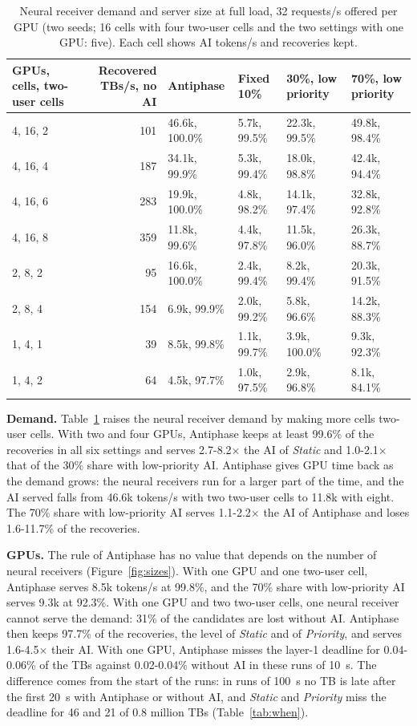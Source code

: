 \documentclass[acmsmall,screen,review,anonymous]{acmart}
\newcommand{\sys}{Antiphase\xspace}
\begin{document}
\begin{table}[t]
\caption{Neural receiver demand and server size at full load, 32 requests/s offered per GPU (two seeds;
16 cells with four two-user cells and the two settings with one GPU: five). Each cell shows AI tokens/s and
recoveries kept.}
\label{tab:scale}
\footnotesize
\setlength{\tabcolsep}{4.5pt}
\begin{tabular}{@{}lrllll@{}}
\toprule
GPUs, cells, two-user cells & Recovered TBs/s, no AI & \sys & Fixed 10\% & 30\%, low priority & 70\%, low priority \\
\midrule
4, 16, 2 & 101 & 46.6k, 100.0\% & 5.7k, 99.5\% & 22.3k, 99.5\% & 49.8k, 98.4\% \\
4, 16, 4 & 187 & 34.1k, 99.9\% & 5.3k, 99.4\% & 18.0k, 98.8\% & 42.4k, 94.4\% \\
4, 16, 6 & 283 & 19.9k, 100.0\% & 4.8k, 98.2\% & 14.1k, 97.4\% & 32.8k, 92.8\% \\
4, 16, 8 & 359 & 11.8k, 99.6\% & 4.4k, 97.8\% & 11.5k, 96.0\% & 26.3k, 88.7\% \\
2, 8, 2 & 95 & 16.6k, 100.0\% & 2.4k, 99.4\% & 8.2k, 99.4\% & 20.3k, 91.5\% \\
2, 8, 4 & 154 & 6.9k, 99.9\% & 2.0k, 99.2\% & 5.8k, 96.6\% & 14.2k, 88.3\% \\
1, 4, 1 & 39 & 8.5k, 99.8\% & 1.1k, 99.7\% & 3.9k, 100.0\% & 9.3k, 92.3\% \\
1, 4, 2 & 64 & 4.5k, 97.7\% & 1.0k, 97.5\% & 2.9k, 96.8\% & 8.1k, 84.1\% \\
\bottomrule
\end{tabular}
\end{table}

\noindent\textbf{Demand.} Table~\ref{tab:scale} raises the neural receiver demand by making more cells
two-user cells. With two and four GPUs, \sys keeps at least 99.6\% of the recoveries in all six settings
and serves 2.7-8.2$\times$ the AI of \textit{Static} and 1.0-2.1$\times$ that of the 30\% share with
low-priority AI. \sys gives GPU time back as the demand grows: the neural receivers run for a larger part
of the time, and the AI served falls from 46.6k tokens/s with two two-user cells to 11.8k with eight. The
70\% share with low-priority AI serves 1.1-2.2$\times$ the AI of \sys and loses 1.6-11.7\% of the recoveries.

\noindent\textbf{GPUs.} The rule of \sys has no value that depends on the number of neural receivers
(Figure~\ref{fig:sizes}). With one GPU and one two-user cell, \sys serves 8.5k tokens/s at 99.8\%, and the
70\% share with low-priority AI serves 9.3k at 92.3\%. With one GPU and two two-user cells, one neural
receiver cannot serve the demand: 31\% of the candidates are lost without AI. \sys then keeps 97.7\% of the
recoveries, the level of \textit{Static} and of \textit{Priority}, and serves
1.6-4.5$\times$ their AI. With one GPU, \sys misses the layer-1 deadline for 0.04-0.06\% of the TBs against
0.02-0.04\% without AI in these runs of 10~s. The difference comes from the start of the runs: in runs of
100~s no TB is late after the first 20~s with \sys or without AI, and \textit{Static} and \textit{Priority}
miss the deadline for 46 and 21 of 0.8 million TBs (Table~\ref{tab:when}).
\end{document}
